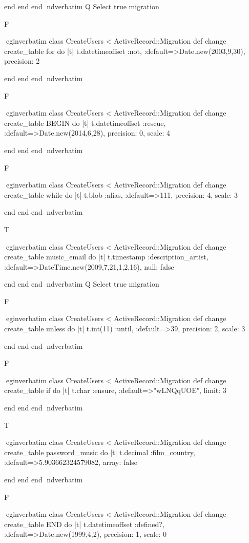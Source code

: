     end 
  end 
end
nd{verbatim}
Q
 Select true migration

F

egin{verbatim}
 class CreateUsers < ActiveRecord::Migration 
  def change 
    create_table for do |t| 
      t.datetimeoffset :not, :default=>Date.new(2003,9,30), precision: 2
    
    end 
  end 
end
nd{verbatim}

F

egin{verbatim}
 class CreateUsers < ActiveRecord::Migration 
  def change 
    create_table BEGIN do |t| 
      t.datetimeoffset :rescue, :default=>Date.new(2014,6,28), precision: 0, scale: 4
    
    end 
  end 
end
nd{verbatim}

F

egin{verbatim}
 class CreateUsers < ActiveRecord::Migration 
  def change 
    create_table while do |t| 
      t.blob :alias, :default=>111, precision: 4, scale: 3
    
    end 
  end 
end
nd{verbatim}

T

egin{verbatim}
 class CreateUsers < ActiveRecord::Migration 
  def change 
    create_table music_email do |t| 
      t.timestamp :description_artist, :default=>DateTime.new(2009,7,21,1,2,16), null: false
    
    end 
  end 
end
nd{verbatim}
Q
 Select true migration

F

egin{verbatim}
 class CreateUsers < ActiveRecord::Migration 
  def change 
    create_table unless do |t| 
      t.int(11) :until, :default=>39, precision: 2, scale: 3
    
    end 
  end 
end
nd{verbatim}

F

egin{verbatim}
 class CreateUsers < ActiveRecord::Migration 
  def change 
    create_table if do |t| 
      t.char :ensure, :default=>"wLNQqUOE", limit: 3
    
    end 
  end 
end
nd{verbatim}

T

egin{verbatim}
 class CreateUsers < ActiveRecord::Migration 
  def change 
    create_table password_music do |t| 
      t.decimal :film_country, :default=>5.903662324579082, array: false
    
    end 
  end 
end
nd{verbatim}

F

egin{verbatim}
 class CreateUsers < ActiveRecord::Migration 
  def change 
    create_table END do |t| 
      t.datetimeoffset :defined?, :default=>Date.new(1999,4,2), precision: 1, scale: 0
    
